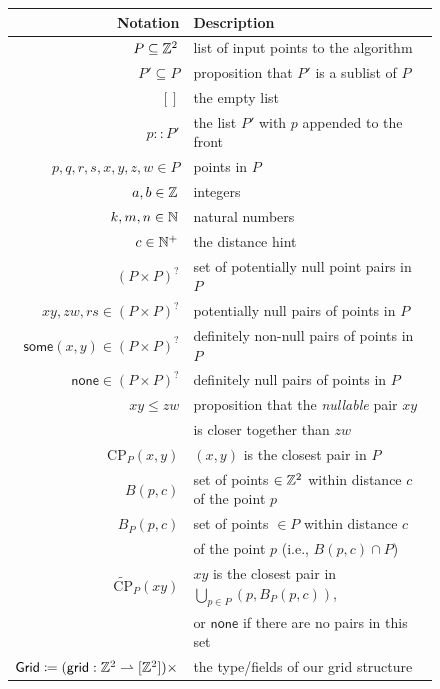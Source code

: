 \documentclass{article}
\begin{document}
\begin{figure}[H]
\begin{center}\label{fig:notation_summary}
\begin{tabular} {|| r | l ||}
  \hline
  Notation & Description \\
  \hline
  \hline
  $P \subseteq \mathbb{Z}^2$ & list of input points to the algorithm \\
  \hline
  $P' \subseteq P$ & proposition that $P'$ is a sublist of $P$ \\
  \hline
  $[]$ & the empty list \\
  \hline
  $p :: P'$ & the list $P'$ with $p$ appended to the front \\
  \hline
  $p, q, r, s, x, y, z, w \in P$ & points in $P$ \\
  \hline
  $a, b \in \mathbb{Z}$ & integers \\
  \hline
  $k, m, n \in \mathbb{N}$ & natural numbers \\
  \hline
  $c \in \mathbb{N}^+$ & the distance hint \\
  \hline
  $(P \times P)^?$ & set of potentially null point pairs in $P$ \\
  \hline
  $x\!y, z\!w, r\!s \in (P \times P)^?$ & potentially null pairs of points in $P$ \\
  \hline
  $\mathsf{some}(x, y) \in (P \times P)^?$ & definitely non-null pairs of points in $P$ \\
  \hline
  $\mathsf{none} \in (P \times P)^?$ & definitely null pairs of points in $P$ \\
  \hline
  $x\!y \leq z\!w$ & proposition that the \textit{nullable} pair $x\!y$ \\ & is closer together than $z\!w$ \\
  \hline
  $\text{CP}_P(x, y)$ & $(x, y)$ is the closest pair in $P$ \\
  \hline
  $B(p, c)$ & set of points $\in \mathbb{Z}^2$ within distance $c$ of the point $p$ \\
  \hline
  $B_P(p, c)$ & set of points $\in P$ within distance $c$ \\ & of the point $p$ (i.e., $B(p, c) \cap P$) \\
  \hline
  $\widetilde{\text{CP}}_P(x\!y)$ & $x\!y$ is the closest pair in $\bigcup_{p \in P} \left(p, B_P(p, c)\right)$, \\ & or $\mathsf{none}$ if there are no pairs in this set \\
  \hline
  $\mathsf{Grid} \coloneqq (\mathsf{grid} : \mathbb{Z}^2 \rightharpoonup [\mathbb{Z}^2]) \times$ & the type/fields of our grid structure \\

\end{tabular}
\end{center}
\end{figure}
\end{document}
